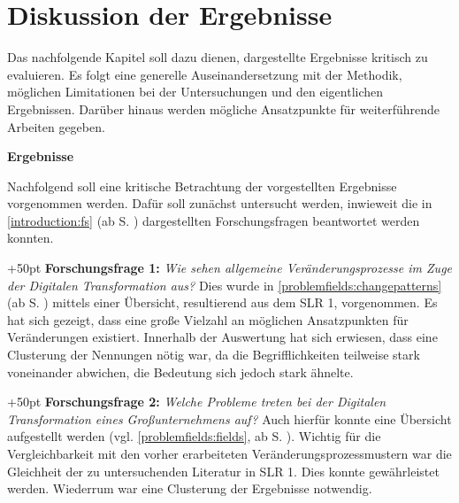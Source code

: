 \chapter{Diskussion der Ergebnisse}
\label{evaluation}


Das nachfolgende Kapitel soll dazu dienen, dargestellte Ergebnisse kritisch zu evaluieren. Es folgt eine generelle Auseinandersetzung mit der Methodik, möglichen Limitationen bei der Untersuchungen und den eigentlichen Ergebnissen. Darüber hinaus werden mögliche Ansatzpunkte für weiterführende Arbeiten gegeben.

\textbf{Ergebnisse}

Nachfolgend soll eine kritische Betrachtung der vorgestellten Ergebnisse vorgenommen werden. Dafür soll zunächst untersucht werden, inwieweit die in \ref{introduction:fs} (ab S. \pageref{introduction:fs}) dargestellten Forschungsfragen beantwortet werden konnten. 

\hangindent+50pt 
\textbf{Forschungsfrage 1:}\textit{ Wie sehen allgemeine Veränderungsprozesse im Zuge der Digitalen Transformation aus?} Dies wurde in  \ref{problemfields:changepatterns} (ab S. \pageref{problemfields:changepatterns}) mittels einer Übersicht, resultierend aus dem SLR 1, vorgenommen. Es hat sich gezeigt, dass eine große Vielzahl an möglichen Ansatzpunkten für Veränderungen existiert. Innerhalb der Auswertung hat sich erwiesen, dass eine Clusterung der Nennungen nötig war, da die Begrifflichkeiten teilweise stark voneinander abwichen, die Bedeutung sich jedoch stark ähnelte.  

\hangindent+50pt 
\textbf{Forschungsfrage 2:} \textit{Welche Probleme treten bei der Digitalen Transformation eines Großunternehmens auf?} Auch hierfür konnte eine Übersicht aufgestellt werden (vgl.  \ref{problemfields:fields}, ab S. \pageref{problemfields:fields}). Wichtig für die Vergleichbarkeit mit den vorher erarbeiteten Veränderungsprozessmustern war die Gleichheit der zu untersuchenden Literatur in SLR 1. Dies konnte gewährleistet werden. Wiederrum war eine Clusterung der Ergebnisse notwendig.

